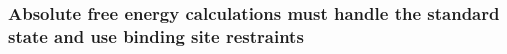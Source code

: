 \documentclass[9pt,bestpractices]{livecoms}
\begin{document}
\subsubsection{Absolute free energy calculations must handle the standard state and use binding site restraints}
\label{sec:standardstate-restraints}

\end{document}
